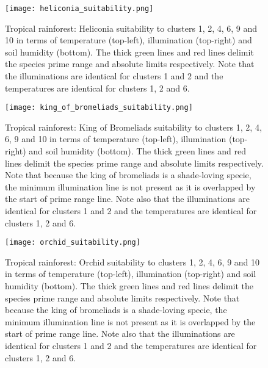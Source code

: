 \begin{figure}
\center
	\texttt{[image: heliconia\_suitability.png]}
	\caption{ Tropical rainforest: Heliconia suitability to clusters 1, 2, 4, 6, 9 and 10 in terms of temperature (top-left), illumination (top-right) and soil humidity (bottom). The thick green lines and red lines delimit the species prime range and absolute limits respectively. Note that the illuminations are identical for clusters 1 and 2 and the temperatures are identical for clusters 1, 2 and 6.}
	\label{fig:results_tropical_heliconia_suitability}
\end{figure}

\begin{figure}
\center
	\texttt{[image: king\_of\_bromeliads\_suitability.png]}
	\caption{ Tropical rainforest: King of Bromeliads suitability to clusters 1, 2, 4, 6, 9 and 10 in terms of temperature (top-left), illumination (top-right) and soil humidity (bottom). The thick green lines and red lines delimit the species prime range and absolute limits respectively. Note that because the king of bromeliads is a shade-loving specie, the minimum illumination line is not present as it is overlapped by the start of prime range line. Note also that the illuminations are identical for clusters 1 and 2 and the temperatures are identical for clusters 1, 2 and 6.}
	\label{fig:results_tropical_king_of_bromeliads_suitability}
\end{figure}

\begin{figure}
\center
	\texttt{[image: orchid\_suitability.png]}
	\caption{ Tropical rainforest: Orchid suitability to clusters 1, 2, 4, 6, 9 and 10 in terms of temperature (top-left), illumination (top-right) and soil humidity (bottom). The thick green lines and red lines delimit the species prime range and absolute limits respectively. Note that because the king of bromeliads is a shade-loving specie, the minimum illumination line is not present as it is overlapped by the start of prime range line. Note also that the illuminations are identical for clusters 1 and 2 and the temperatures are identical for clusters 1, 2 and 6.}
	\label{fig:results_tropical_orchid_suitability}
\end{figure}

